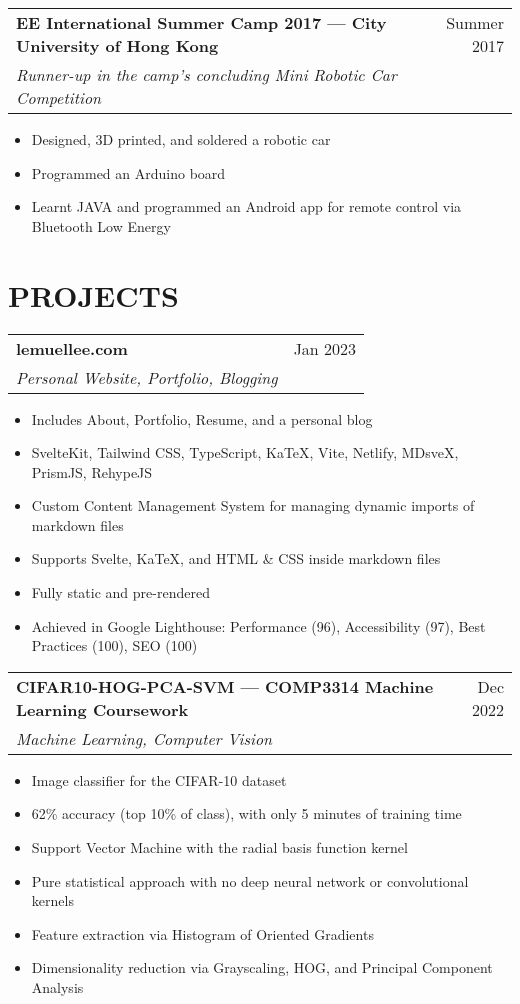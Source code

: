 \documentclass{article}
\newcommand{\jobTitle}[3]{
\vspace{0.4cm}
\begin{tabularx}{0.99\linewidth}{ X r }
    \textbf{#1} & #2\\
    \textit{#3} &
\end{tabularx}
\vspace{0.2cm}
}
\newenvironment{descitemize}
{ \begin{itemize}[leftmargin=1.4cm,,topsep=0pt]
    \setlength{\parskip}{0pt}
    \setlength{\parsep}{0pt}     }
{ \end{itemize}                  }
\begin{document}
\jobTitle
{EE International Summer Camp 2017 --- City University of Hong Kong}
{Summer 2017}
{Runner-up in the camp's concluding Mini Robotic Car Competition}
\begin{descitemize}
    \item Designed, 3D printed, and soldered a robotic car
    \item Programmed an Arduino board
    \item Learnt JAVA and programmed an Android app for remote control via Bluetooth Low Energy
\end{descitemize}

\section{PROJECTS}

\jobTitle
{lemuellee.com}
{Jan 2023}
{Personal Website, Portfolio, Blogging}
\begin{descitemize}
    \item Includes About, Portfolio, Resume, and a personal blog
    \item SvelteKit, Tailwind CSS, TypeScript, KaTeX, Vite, Netlify, MDsveX, PrismJS, RehypeJS
    \item Custom Content Management System for managing dynamic imports of markdown files
	\item Supports Svelte, KaTeX, and HTML \& CSS inside markdown files
	\item Fully static and pre-rendered
	\item Achieved in Google Lighthouse: Performance (96), Accessibility (97), Best Practices (100), SEO (100)
\end{descitemize}

\jobTitle
{CIFAR10-HOG-PCA-SVM --- COMP3314 Machine Learning Coursework}
{Dec 2022}
{Machine Learning, Computer Vision}
\begin{descitemize}
    \item Image classifier for the CIFAR-10 dataset
    \item 62\% accuracy (top 10\% of class), with only 5 minutes of training time
    \item Support Vector Machine with the radial basis function kernel
    \item Pure statistical approach with no deep neural network or convolutional kernels
    \item Feature extraction via Histogram of Oriented Gradients
    \item Dimensionality reduction via Grayscaling, HOG, and Principal Component Analysis
\end{descitemize}
\end{document}

